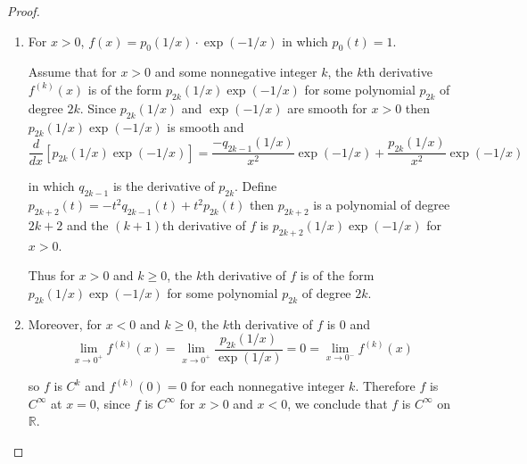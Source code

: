\begin{proof}
	\begin{enumerate}[label={(\alph*)}]
		\item For \( x > 0 \), \( f(x) = p_{0}(1/x)\cdot \exp(-1/x) \) in which \( p_{0}(t) = 1 \).

		      Assume that for \( x > 0 \) and some nonnegative integer \( k \), the \(k\)th derivative \( f^{(k)}(x) \) is of the form \( p_{2k}(1/x) \exp(-1/x) \) for some polynomial \( p_{2k} \) of degree \( 2k \). Since \( p_{2k}(1/x) \) and \( \exp(-1/x) \) are smooth for \( x > 0 \) then \( p_{2k}(1/x)\exp(-1/x) \) is smooth and
		      \[
			      \frac{d}{dx} [p_{2k}(1/x)\exp(-1/x)] = \frac{-q_{2k-1}(1/x)}{x^{2}}\exp(-1/x) + \frac{p_{2k}(1/x)}{x^{2}}\exp(-1/x)
		      \]

		      in which \( q_{2k-1} \) is the derivative of \( p_{2k} \). Define \( p_{2k+2}(t) = -t^{2}q_{2k-1}(t) + t^{2}p_{2k}(t) \) then \( p_{2k+2} \) is a polynomial of degree \( 2k + 2 \) and the \( (k+1) \)th derivative of \( f \) is \( p_{2k+2}(1/x)\exp(-1/x) \) for \( x > 0 \).

		      Thus for \( x > 0 \) and \( k \ge 0 \), the \( k \)th derivative of \( f \) is of the form \( p_{2k}(1/x)\exp(-1/x) \) for some polynomial \( p_{2k} \) of degree \( 2k \).
		\item  Moreover, for \( x < 0 \) and \( k \ge 0 \), the \( k \)th derivative of \( f \) is 0 and
		      \[
			      \lim\limits_{x\to 0^{+}} f^{(k)}(x) = \lim\limits_{x\to 0^{+}} \frac{p_{2k}(1/x)}{\exp(1/x)} = 0 = \lim\limits_{x\to 0^{-}} f^{(k)}(x)
		      \]

		      so \( f \) is \( C^{k} \) and \( f^{(k)}(0) = 0 \) for each nonnegative integer \( k \). Therefore \( f \) is \( C^{\infty} \)  at \( x = 0 \), since \( f \) is \( C^{\infty} \) for \( x > 0 \) and \( x < 0 \), we conclude that \( f \) is \( C^{\infty} \) on \( \mathbb{R} \).
	\end{enumerate}
\end{proof}

